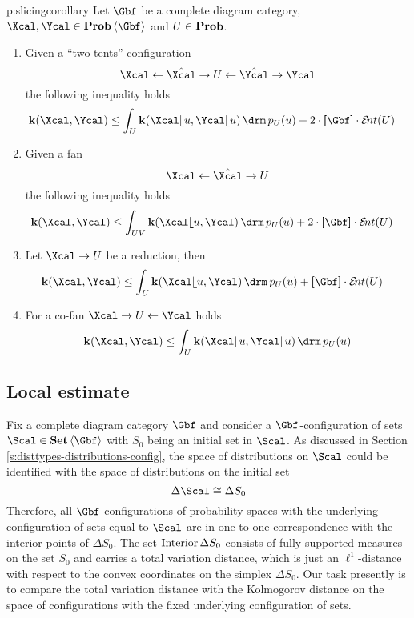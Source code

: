   \begin{corollary}{p:slicingcorollary}
    Let $\Gbf$ be a complete diagram category, $\Xcal,\Ycal\in\prob\<\Gbf>$ and
    $U\in\operatorname{\mathbf{Prob}}$.
    \begin{enumerate}
    \item
      \label{i:slicing2tents}
      Given a ``two-tents'' configuration
      \[
      \Xcal\ot\hat\Xcal\to U\ot\hat\Ycal\to\Ycal
      \]
      the following inequality holds
      \begin{align*}
      \ikd(\Xcal,\Ycal) 
      &\leq 
      \int_{U}\ikd(\Xcal\rel u,\Ycal\rel u)\d p_{U}(u)
      +2\cdot\size{\Gbf}\cdot\ent(U)
      \end{align*}
    \item 
    \label{p:slicingtwofan}
      Given a fan
      \[
      \Xcal\ot\hat\Xcal\to U
      \]
      the following inequality holds
      \begin{align*}
        \ikd(\Xcal,\Ycal)
        &\leq 
        \int_{UV}\ikd(\Xcal\rel u,\Ycal)\d p_{U}(u)
        + 
        2\cdot\size{\Gbf}\cdot\ent(U)
      \end{align*}
    \item
      \label{p:slicingreduction}      
      Let $\Xcal\to U$ be a reduction, then
      \begin{align*}
      \ikd(\Xcal,\Ycal) 
      &\leq 
      \int_{U}\ikd(\Xcal\rel u,\Ycal)\d p_{U}(u)+
      \size{\Gbf}\cdot\ent(U)
      \end{align*}
    \item
      \label{p:slicingcofan}
      For a co-fan $\Xcal\to U\ot\Ycal$ holds
      \[
      \ikd(\Xcal,\Ycal)
      \leq
      \int_{U}\ikd(\Xcal\rel u,\Ycal\rel u)\d p_{U}(u)
      \]
    \end{enumerate}
  \end{corollary}
  
\subsection{Local estimate}\label{s:kolmogorov-local}
  Fix a complete diagram category $\Gbf$ and consider a
  $\Gbf$-configuration of sets $\Scal\in\Set\<\Gbf>$ with $S_{0}$
  being an initial set in $\Scal$. As discussed in Section
  \ref{s:disttypes-distributions-config}, the space of distributions
  on $\Scal$ could be identified with the space of distributions on the
  initial set
  \[
  \Delta\Scal\cong\Delta S_{0}
  \]
  Therefore, all $\Gbf$-configurations of probability spaces with the
  underlying configuration of sets equal to $\Scal$ are in one-to-one
  correspondence with the interior points of $\Delta S_{0}$.  The set
  $\operatorname{\mathrm{Interior}}\Delta S_{0}$ consists of fully supported measures on the
  set $S_{0}$ and carries a total variation distance, which is just an
  $\ell^{1}$-distance with respect to the convex coordinates on the
  simplex $\Delta S_{0}$.  Our task presently is to compare the total
  variation distance with the Kolmogorov distance on the space of
  configurations with the fixed underlying configuration of sets.

